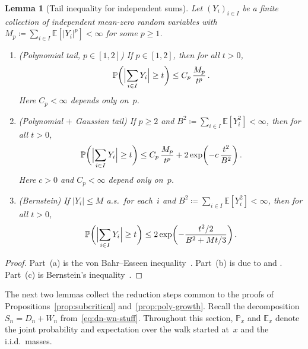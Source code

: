 \documentclass[11pt]{amsart}
\theoremstyle{plain}
\newtheorem{lemma}[theorem]{Lemma}
\theoremstyle{definition}
\newcommand{\E}{\mathbb{E}}
\renewcommand{\P}{\mathbb{P}}
\begin{document}
	\begin{lemma}[Tail inequality for independent sums]\label{lem:fuk-nagaev}
		Let $(Y_i)_{i\in I}$ be a finite collection of independent mean-zero random variables with $M_p\coloneqq\sum_{i\in I}\E[|Y_i|^p]<\infty$ for some $p\geq 1$.
		\begin{enumerate}[label=\textup{(\alph*)}]
			\item \textup{(Polynomial tail, $p\in[1,2]$)}\; If $p\in[1,2]$, then for all $t>0$,
			\begin{equation}\label{eq:poly-tail}
				\P\biggl(\Bigl|\sum_{i\in I}Y_i\Bigr|\geq t\biggr)\leq C_p\,\frac{M_p}{t^p}\,.
			\end{equation}
			Here $C_p<\infty$ depends only on~$p$.
			\item \textup{(Polynomial $+$ Gaussian tail)}\; If $p\geq 2$ and $B^2\coloneqq\sum_{i\in I}\E[Y_i^2]<\infty$, then for all $t>0$,
			\begin{equation}\label{eq:fuk-nagaev}
				\P\biggl(\Bigl|\sum_{i\in I}Y_i\Bigr|\geq t\biggr)\leq C_p\,\frac{M_p}{t^p}+2\exp\biggl(-c\,\frac{t^2}{B^2}\biggr)\,.
			\end{equation}
			Here $c>0$ and $C_p<\infty$ depend only on~$p$.
			\item \textup{(Bernstein)}\; If $|Y_i|\leq M$ a.s.\ for each~$i$ and $B^2\coloneqq\sum_{i\in I}\E[Y_i^2]<\infty$, then for all $t>0$,
			\begin{equation}\label{eq:bernstein}
				\P\biggl(\Bigl|\sum_{i\in I}Y_i\Bigr|\geq t\biggr)\leq 2\exp\biggl(-\frac{t^2/2}{B^2+Mt/3}\biggr)\,.
			\end{equation}
		\end{enumerate}
	\end{lemma}
	\begin{proof}
		Part~(a) is the von Bahr--Esseen inequality~\citep{vonBahrEsseen65}. Part~(b) is due to \citet{FukNagaev71} and \citet{Nagaev79}. Part~(c) is Bernstein's inequality~\citep[Chapter~III, Theorem~17]{Petrov}.
	\end{proof}
	
	The next two lemmas collect the reduction steps common to the proofs of Propositions~\ref{prop:subcritical} and~\ref{prop:poly-growth}. Recall the decomposition $S_n = D_n + W_n$ from~\eqref{eq:dn-wn-stuff}. Throughout this section, $\P_x$ and $\E_x$ denote the joint probability and expectation over the walk started at~$x$ and the i.i.d.\ masses.
	
\end{document}
